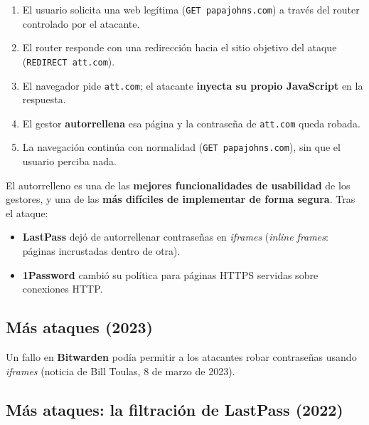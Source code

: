 \documentclass[11pt,a4paper]{report}
\begin{document}
\begin{enumerate}
  \item El usuario solicita una web legítima (\texttt{GET papajohns.com}) a través del router controlado por el atacante.
  \item El router responde con una redirección hacia el sitio objetivo del ataque (\texttt{REDIRECT att.com}).
  \item El navegador pide \texttt{att.com}; el atacante \textbf{inyecta su propio JavaScript} en la respuesta.
  \item El gestor \textbf{autorrellena} esa página y la contraseña de \texttt{att.com} queda robada.
  \item La navegación continúa con normalidad (\texttt{GET papajohns.com}), sin que el usuario perciba nada.
\end{enumerate}
 
\begin{importante}[title={Consecuencias}]
El autorrelleno es una de las \textbf{mejores funcionalidades de usabilidad} de los gestores, y una de las \textbf{más difíciles de implementar de forma segura}. Tras el ataque:
\begin{itemize}
  \item \textbf{LastPass} dejó de autorrellenar contraseñas en \emph{iframes} (\emph{inline frames}: páginas incrustadas dentro de otra).
  \item \textbf{1Password} cambió su política para páginas HTTPS servidas sobre conexiones HTTP.
\end{itemize}
\end{importante}
 
\subsection{Más ataques (2023)}
Un fallo en \textbf{Bitwarden} podía permitir a los atacantes robar contraseñas usando \emph{iframes} (noticia de Bill Toulas, 8 de marzo de 2023).
 
\subsection{Más ataques: la filtración de LastPass (2022)}
 
\end{document}

